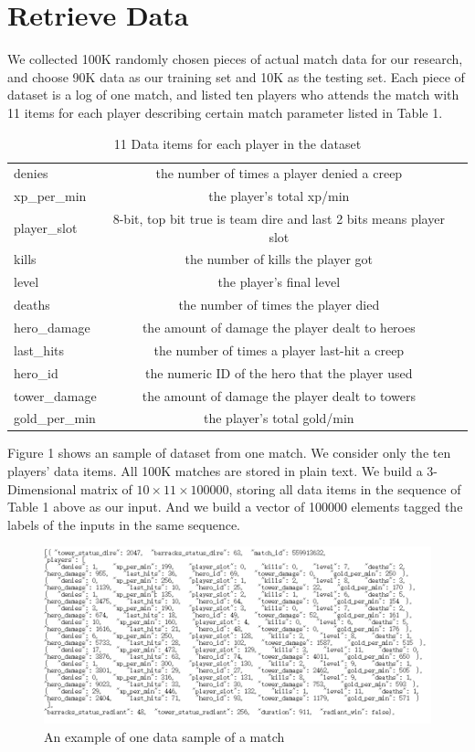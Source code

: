 \documentclass[a4paper, 11pt]{article} %
\begin{document}
\section{Retrieve Data}
We collected 100K randomly chosen pieces of actual match data for our research, and choose 90K data as our training set and 10K as the testing set. Each piece of dataset is a log of one match, and listed ten players who attends the match with 11 items for each player describing certain match parameter listed in Table 1.
\begin{table}[htbp]	
	\centering 
	\begin{tabular}{lcl}
		\toprule
		denies & the number of times a player denied a creep\\
		xp\_per\_min &  the player's total xp/min\\
		player\_slot & 8-bit, top bit true is team dire and last 2 bits means player slot\\
		kills & the number of kills the player got\\
		level & the player's final level\\
		deaths & the number of times the player died\\
		hero\_damage &  the amount of damage the player dealt to heroes\\
		last\_hits & the number of times a player last-hit a creep\\
		hero\_id & the numeric ID of the hero that the player used\\
		tower\_damage & the amount of damage the player dealt to towers\\
		gold\_per\_min & the player's total gold/min\\
		
		\bottomrule
	\end{tabular}
	\caption{\label{tab:test}11 Data items for each player in the dataset}
\end{table}

Figure 1 shows an sample of dataset from one match. We consider only the ten players' data items. All 100K matches are stored in plain text. We build a 3-Dimensional matrix of $10 \times 11 \times 100000$, storing all data items in the sequence of Table 1 above as our input. And we build a vector of 100000 elements tagged the labels of the inputs in the same sequence.
\begin{figure}[h]
	\centering 
	\includegraphics[width=1.0\linewidth]{Figure1.png}
	\caption{An example of one data sample of a match}
	\label{fig:subfig}
\end{figure}
\end{document}
